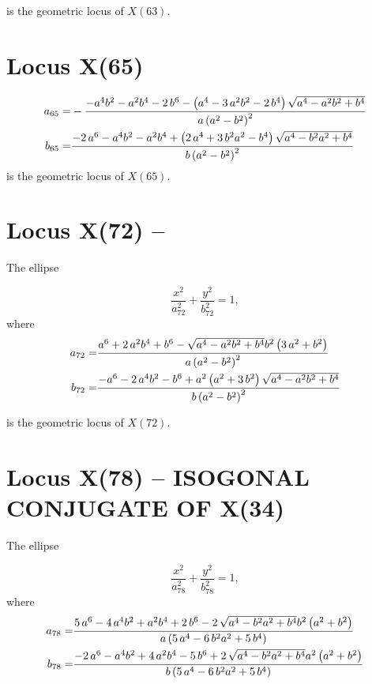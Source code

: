 \documentclass[11pt]{amsart}
\theoremstyle{plain}
\theoremstyle{definition}
\begin{document}
       is the geometric locus of $X(63)$.
     
      \section{Locus X(65) }
    \[   \aligned
     a_{ 65}=&-{\frac {-{a}^{4}{b}^{2}-{a}^{2}{b}^{4}-2\,{b}^{6}- \left( {a}^{4}-3\,
     		{a}^{2}{b}^{2}-2\,{b}^{4} \right) \sqrt {{a}^{4}-{a}^{2}{b}^{2}+{b}^{4
     	}}}{a \left( a^2-b^2 \right)^{2}  }}\\
     b_{65}=&{\frac {-2\,{a}^{6}-{a}^{4}{b}^{2}-{a}^{2}{b}^{4}+ \left( 2\,{a}^{4}+3
     		\,{b}^{2}{a}^{2}-{b}^{4} \right) \sqrt {{a}^{4}-{b}^{2}{a}^{2}+{b}^{4}
     	}}{b \left( {a}^{2}-{b}^{2} \right) ^{2}}}
     \endaligned
     \]
          is the geometric locus of $X(65)$.
          
            \section{Locus X(72) --  }
          
          
          The ellipse 
          
          \[ \frac{x^2}{a_{72}^2}+\frac{y^2}{b_{72}^2}=1, \]
          where
          \[   \aligned
          a_{ 72}=&  {\frac {{a}^{6}+2\,{a}^{2}{b}^{4}+{b}^{6}-\sqrt {{a}^{4}-{a}^{2}{b}^{2
          			}+{b}^{4}}{b}^{2} \left( 3\,{a}^{2}+{b}^{2} \right) }{a \left( a^2-b^2
          		\right) ^{2}  }}
          \\
          b_{72}=&  {\frac {-{a}^{6}-2\,{a}^{4}{b}^{2}-{b}^{6}+{a}^{2} \left( {a}^{2}+3\,{
          			b}^{2} \right) \sqrt {{a}^{4}-{a}^{2}{b}^{2}+{b}^{4}}}{b \left( a^2-b^2
          		\right) ^{2}  }}
          \endaligned
          \]
          
          is the geometric locus of $X(72)$.
          
            \section{Locus X(78)  --  ISOGONAL CONJUGATE OF X(34)}
          
          
          The ellipse 
          
          \[ \frac{x^2}{a_{78}^2}+\frac{y^2}{b_{78}^2}=1, \]
          where
          \[   \aligned
          a_{ 78}=&  {\frac {5\,{a}^{6}-4\,{a}^{4}{b}^{2}+{a}^{2}{b}^{4}+2\,{b}^{6}-2\,
          		\sqrt {{a}^{4}-{b}^{2}{a}^{2}+{b}^{4}}{b}^{2} \left( {a}^{2}+{b}^{2}
          		\right) }{a \left( 5\,{a}^{4}-6\,{b}^{2}{a}^{2}+5\,{b}^{4} \right) }}
          \\
          b_{78}=&  {\frac {-2\,{a}^{6}-{a}^{4}{b}^{2}+4\,{a}^{2}{b}^{4}-5\,{b}^{6}+2\,
          		\sqrt {{a}^{4}-{b}^{2}{a}^{2}+{b}^{4}}{a}^{2} \left( {a}^{2}+{b}^{2}
          		\right) }{b \left( 5\,{a}^{4}-6\,{b}^{2}{a}^{2}+5\,{b}^{4} \right) }}
          \endaligned
          \]
          
\end{document}
